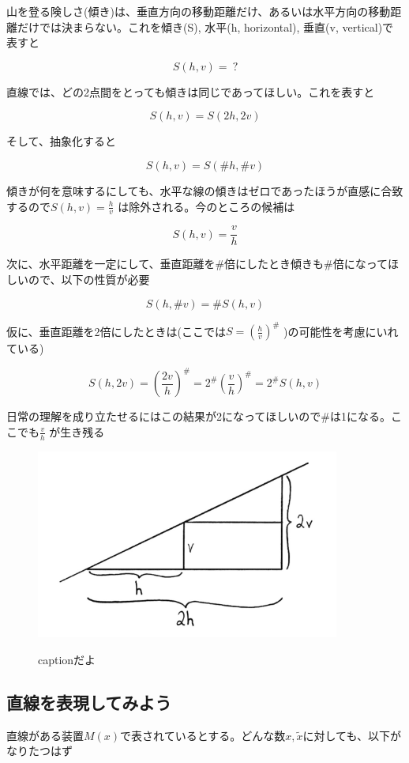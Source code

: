 \documentclass[dvipdfmx]{jsarticle}
\begin{document}
山を登る険しさ(傾き)は、垂直方向の移動距離だけ、あるいは水平方向の移動距離だけでは決まらない。これを傾き(S), 水平(h, horizontal), 垂直(v, vertical)で表すと

\[ S(h,v) = \ ? \]

直線では、どの2点間をとっても傾きは同じであってほしい。これを表すと

\[ S(h,v) = S(2h, 2v) \]

そして、抽象化すると

\[ S(h,v) = S(\#h, \#v) \]

傾きが何を意味するにしても、水平な線の傾きはゼロであったほうが直感に合致するので$S(h,v) = \frac{h}{v}$ は除外される。今のところの候補は

\[ S(h,v) = \frac{v}{h} \]

次に、水平距離を一定にして、垂直距離を\#倍にしたとき傾きも\#倍になってほしいので、以下の性質が必要

\[ S(h,\#v) = \#S(h,v) \]

仮に、垂直距離を2倍にしたときは(ここでは$S = (\frac{h}{v})^\#$ )の可能性を考慮にいれている)

\[ S(h,2v) = (\frac{2v}{h})^\#  = 2^\#(\frac{v}{h})^\# = 2^\#S(h,v) \]

日常の理解を成り立たせるにはこの結果が2になってほしいので\#は1になる。ここでも$\frac{v}{h}$ が生き残る


\begin{figure}
  \centering
  \includegraphics[width=10cm]{images/burn_math_1-8.png}
  \label{fig:1-8}
  \caption{captionだよ}
\end{figure}

\subsection{直線を表現してみよう}

直線がある装置$M(x)$で表されているとする。どんな数$x, \tilde{x}$に対しても、以下がなりたつはず
\end{document}
